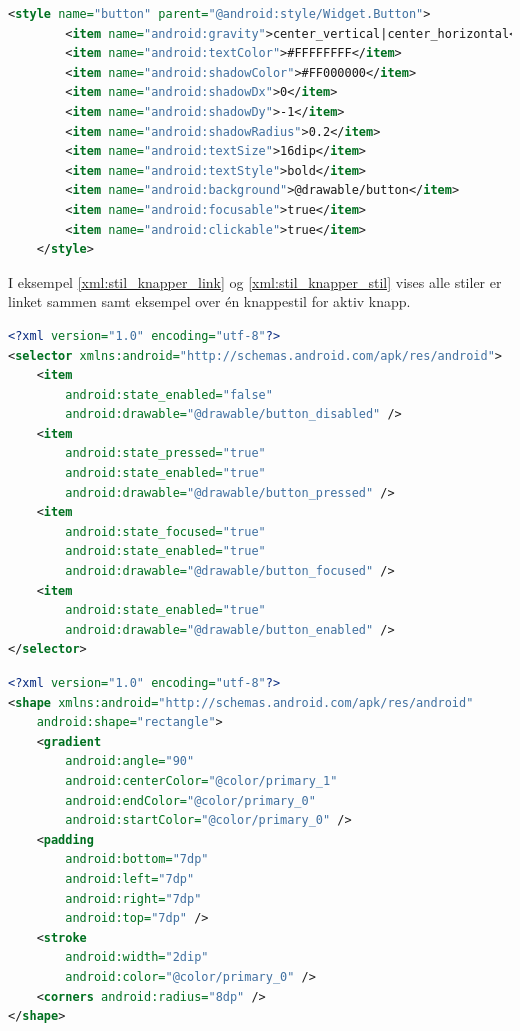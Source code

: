 \begin{lstlisting}[language=XML, caption=Redefinert stil for knapper i styles.xml, label=xml:stil_knapper]
    <style name="button" parent="@android:style/Widget.Button">
        <item name="android:gravity">center_vertical|center_horizontal</item>
        <item name="android:textColor">#FFFFFFFF</item>
        <item name="android:shadowColor">#FF000000</item>
        <item name="android:shadowDx">0</item>
        <item name="android:shadowDy">-1</item>
        <item name="android:shadowRadius">0.2</item>
        <item name="android:textSize">16dip</item>
        <item name="android:textStyle">bold</item>
        <item name="android:background">@drawable/button</item>
        <item name="android:focusable">true</item>
        <item name="android:clickable">true</item>
    </style>
\end{lstlisting}

I eksempel \ref{xml:stil_knapper_link} og \ref{xml:stil_knapper_stil} vises alle stiler er linket sammen samt eksempel over én knappestil for aktiv knapp.


\begin{lstlisting}[language=XML, caption=\texttt{button.xml} konfigurasjon som linker inn alle stiler, label=xml:stil_knapper_link]
<?xml version="1.0" encoding="utf-8"?>
<selector xmlns:android="http://schemas.android.com/apk/res/android">
    <item
        android:state_enabled="false"
        android:drawable="@drawable/button_disabled" />
    <item
        android:state_pressed="true"
        android:state_enabled="true"
        android:drawable="@drawable/button_pressed" />
    <item
        android:state_focused="true"
        android:state_enabled="true"
        android:drawable="@drawable/button_focused" />
    <item
        android:state_enabled="true"
        android:drawable="@drawable/button_enabled" />
</selector>
\end{lstlisting}

\begin{lstlisting}[language=XML, caption=\texttt{button\_enabled.xml} eksempel på en knappestil for aktivert knapp, label=xml:stil_knapper_stil]
<?xml version="1.0" encoding="utf-8"?>
<shape xmlns:android="http://schemas.android.com/apk/res/android"
    android:shape="rectangle">
    <gradient
        android:angle="90"
        android:centerColor="@color/primary_1"
        android:endColor="@color/primary_0"
        android:startColor="@color/primary_0" />
    <padding
        android:bottom="7dp"
        android:left="7dp"
        android:right="7dp"
        android:top="7dp" />
    <stroke
        android:width="2dip"
        android:color="@color/primary_0" />
    <corners android:radius="8dp" />
</shape>
\end{lstlisting}

